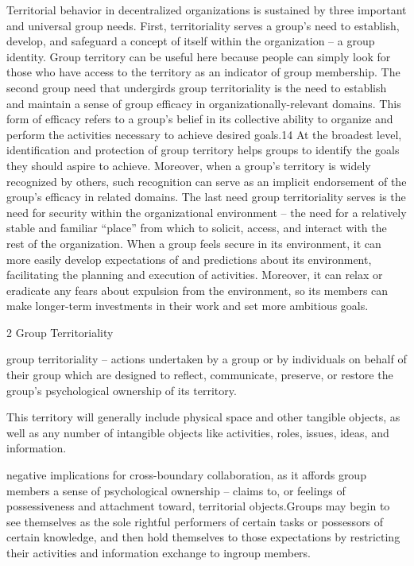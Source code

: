     
Territorial behavior in decentralized organizations is sustained by three important and universal group needs.  
    First, territoriality serves a group’s need to establish, develop, and safeguard a  concept of itself within the organization – a group identity.  Group territory can be useful here  because people can simply look for those who have access to the territory as an indicator of group membership.
    The second group need that undergirds group territoriality is the need to establish and maintain a sense of group efficacy in organizationally-relevant domains. This form of efficacy refers to a group’s belief in its collective ability to organize and perform the activities necessary to achieve desired goals.14 At the broadest level, identification and protection of group territory helps groups to identify the goals they should aspire to achieve. Moreover, when a group’s territory is widely recognized by others, such recognition can serve as an implicit endorsement of the group’s efficacy in related domains.
    The last need group territoriality serves is the need for security within the organizational environment – the need for a relatively stable and familiar “place” from which to solicit, access, and interact with the rest of the organization.  When a group feels secure in its environment, it can more easily develop expectations of and predictions about its environment, facilitating the planning and execution of activities. Moreover, it can relax or eradicate any fears about expulsion from the environment, so its members can make longer-term investments in their work and set more ambitious goals.

    
    
    2 Group Territoriality
    
    
group territoriality – actions undertaken by a group or by individuals on behalf of their group which are designed to reflect, communicate, preserve, or restore the group's psychological ownership of its territory.

This territory will generally include physical space and other tangible objects, as well as any number of intangible objects like activities, roles, issues, ideas, and information.

negative implications for cross-boundary collaboration, as it affords group members a sense of psychological ownership – claims to, or feelings of possessiveness and attachment toward, territorial objects.Groups may begin to see themselves as the sole rightful performers of certain tasks or possessors of certain knowledge, and then hold themselves to those expectations by restricting their activities and information exchange to ingroup members.

